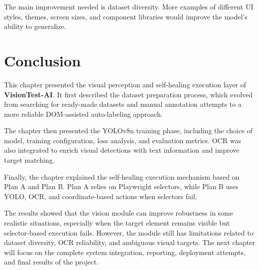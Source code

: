 The main improvement needed is dataset diversity. More examples of different UI styles, themes, screen sizes, and component libraries would improve the model's ability to generalize.

\section{Conclusion}
\label{sec:ch4_conclusion}

This chapter presented the visual perception and self-healing execution layer of \textbf{VisionTest-AI}. It first described the dataset preparation process, which evolved from searching for ready-made datasets and manual annotation attempts to a more reliable DOM-assisted auto-labeling approach.

The chapter then presented the YOLOv8n training phase, including the choice of model, training configuration, loss analysis, and evaluation metrics. OCR was also integrated to enrich visual detections with text information and improve target matching.

Finally, the chapter explained the self-healing execution mechanism based on Plan A and Plan B. Plan A relies on Playwright selectors, while Plan B uses YOLO, OCR, and coordinate-based actions when selectors fail.

The results showed that the vision module can improve robustness in some realistic situations, especially when the target element remains visible but selector-based execution fails. However, the module still has limitations related to dataset diversity, OCR reliability, and ambiguous visual targets. The next chapter will focus on the complete system integration, reporting, deployment attempts, and final results of the project.

